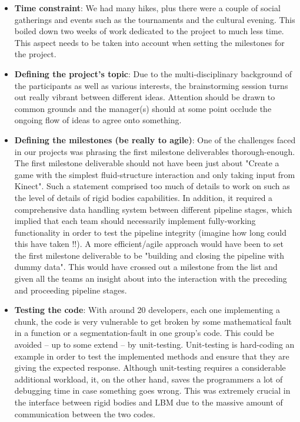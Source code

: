 \begin{itemize}
  \item \textbf{Time constraint}: We had many hikes, plus there were a couple of social gatherings and events such as the tournaments and the cultural evening. This boiled down two weeks of work dedicated to the project to much less time. This aspect needs to be taken into account when setting the milestones for the project.
  \item \textbf{Defining the project's topic}: Due to the multi-disciplinary background of the participants as well as various interests, the brainstorming session turns out really vibrant between different ideas. Attention should be drawn to common grounds and the manager(s) should at some point occlude the ongoing flow of ideas to agree onto something.
  \item \textbf{Defining the milestones (be really to  agile)}: One of the challenges faced in our projects was phrasing the first milestone deliverables thorough-enough. The first milestone deliverable should not have been just about "Create a game with the simplest fluid-structure interaction and only taking input from Kinect". Such a statement comprised too much of details to work on such as the level of details of rigid bodies capabilities. In addition, it required a comprehensive data handling system between different pipeline stages, which implied that each team should necessarily implement fully-working functionality in order to test the pipeline integrity (imagine how long could this have taken !!).
  A more efficient/agile approach would have been to set the first milestone deliverable to be "building and closing the pipeline with dummy data". This would have crossed out a milestone from the list and given all the teams an insight about into the interaction with the preceding and proceeding pipeline stages.
  \item \textbf{Testing the code}: With around 20 developers, each one implementing a chunk, the code is very vulnerable to get broken by some mathematical fault in a function or a segmentation-fault in one group's code. This could be avoided -- up to some extend -- by unit-testing. Unit-testing is hard-coding an example in order to test the implemented methods and ensure that they are giving the expected response. Although unit-testing requires a considerable additional workload, it, on the other hand, saves the programmers a lot of debugging time in case something goes wrong. This was extremely crucial in the interface between rigid bodies and LBM due to the massive amount of communication between the two codes.

\end{itemize}

